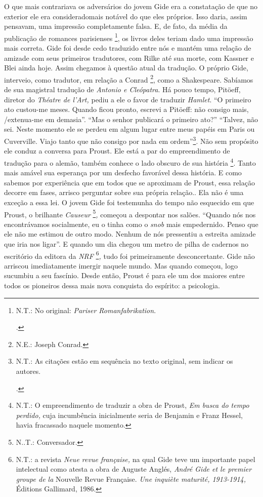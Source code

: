 O que mais contrariava os adversários do jovem Gide era a constatação de
que no exterior ele era consideradomais notável do que eles próprios.
Isso daria, assim pensavam, uma impressão completamente falsa. E, de
fato, da média da publicação de romances parisienses \footnote{N.T.: No
  original: \emph{Pariser Romanfabrikation}.

  .}, os livros deles teriam dado uma impressão mais correta. Gide foi
desde cedo traduzido entre nós e mantém uma relação de amizade com seus
primeiros tradutores, com Rilke até sua morte, com Kassner e Blei ainda
hoje. Assim chegamos à questão atual da tradução. O próprio Gide,
interveio, como tradutor, em relação a Conrad \footnote{N.E.: Joseph
  Conrad.}, como a Shakespeare. Sabíamos de sua magistral tradução de
\emph{Antonio e Cleópatra}. Há pouco tempo, Pitöeff, diretor do
\emph{Théatre de l'Art,} pediu a ele o favor de traduzir \emph{Hamlet}.
``O primeiro ato custou-me meses. Quando ficou pronto, escrevi a
Pitöeff: não consigo mais, /extenua-me em demasia''. ``Mas o senhor
publicará o primeiro ato?'' ``Talvez, não sei. Neste momento ele se
perdeu em algum lugar entre meus papéis em Paris ou Cuverville. Viajo
tanto que não consigo por nada em ordem''\footnote{N.T.: As citações
  estão em sequência no texto original, sem indicar os autores.

  .}. Não sem propósito ele conduz a conversa para Proust. Ele está a
par do empreendimento de tradução para o alemão, também conhece o lado
obscuro de sua história \footnote{N.T.: O empreendimento de traduzir a
  obra de Proust, \emph{Em busca do tempo perdido,} cuja incumbência
  inicialmente seria de Benjamin e Franz Hessel, havia fracassado
  naquele momento.}. Tanto mais amável sua esperança por um desfecho
favorável dessa história. E como sabemos por experiência que em todos
que se aproximam de Proust, essa relação decorre em fases, arrisco
perguntar sobre sua própria relação.. Ela não é uma exceção a essa lei.
O jovem Gide foi testemunha do tempo não esquecido em que Proust, o
brilhante \emph{Causeur} \footnote{N..T.: Conversador.}\emph{,} começou
a despontar nos salões. ``Quando nós nos encontrávamos socialmente, eu o
tinha como o \emph{snob} mais empedernido\emph{.} Penso que ele não me
estimou de outro modo. Nenhum de nós pressentiu a estreita amizade que
iria nos ligar''. E quando um dia chegou um metro de pilha de cadernos
no escritório da editora da \emph{NRF} \footnote{N.T.: a revista
  \emph{Neue revue française,} na qual Gide teve um importante papel
  intelectual como atesta a obra de Auguste Anglés, \emph{André Gide et
  le premier groupe de la} Nouvelle Revue Française. \emph{Une inquiète
  maturité, 1913-1914,} Éditions Gallimard, 1986.}\emph{,} tudo foi
primeiramente desconcertante. Gide não arriscou imediatamente imergir
naquele mundo. Mas quando começou, logo sucumbiu a seu fascínio. Desde
então, Proust é para ele um dos maiores entre todos os pioneiros dessa
mais nova conquista do espírito: a psicologia.

